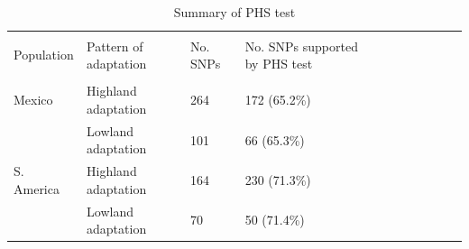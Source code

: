 \renewcommand{\arraystretch}{1.1}
\begin{table}[h]

\begin{center}
 \caption[]{Summary of PHS test\hspace*{6.1cm}}
  \textbf{}\\[-2mm]
{\fontsize{8}{11}\sf
    \begin{tabular}{lllllcccccl} \hline\hline
       & & \\[-3mm]
     Population  & Pattern of adaptation & No. SNPs & No. SNPs supported by PHS test \\[0.1cm]
    \hline
    & & \\[-3mm]
   Mexico & Highland adaptation & 264 & 172 (65.2\%)  \\
               & Lowland adaptation & 101 & 66 (65.3\%)  \\
   S. America & Highland adaptation & 164 & 230 (71.3\%)  \\
                     & Lowland adaptation & 70 & 50 (71.4\%)  \\[0.1cm]
    \hline\hline
    \end{tabular}
    \label{supp:phs}  %
}
\end{center}
\end{table}
\renewcommand{\arraystretch}{1}

